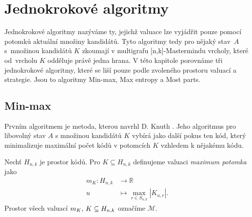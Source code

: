 
\chapter{Jednokrokové algoritmy}
Jednokrokové algoritmy nazýváme ty, jejichž valuace lze vyjádřit pouze pomocí potomků aktuální množiny kandidátů. Tyto algoritmy tedy pro nějaký stav~$A$ s~množinou kandidátů $K$ zkoumají v multigrafu [n,k]-Mastermindu vrcholy, které od~vrcholu $K$ odděluje právě jedna hrana. V této kapitole porovnáme tři jednokrokové algoritmy, které se liší pouze podle zvoleného prostoru valuací a strategie. Jsou to algoritmy Min-max, Max entropy a Most parts. 







\section{Min-max}
Prvním algoritmem je metoda, kterou navrhl D. Knuth \cite{donald_e__knuth_1977}. Jeho algoritmus pro libovolný stav $A$ s množinou kandidátů $K$ vybírá jako další pokus ten kód, který minimalizuje maximální počet kódů v potomcích $K$ vzhledem k nějakému kódu. 
\begin{definice}
    Nechť $H_{n,k}$ je prostor kódů. Pro $K \subseteq H_{n,k}$ definujeme valuaci \emph{maximum potomka} jako
    \begin{align*}
        m_K \colon H_{n,k} &\to \mathbb{R} \\
        u &\mapsto \max_{r\in S_{n,k}} |K_{u,r}|.
    \end{align*}
    Prostor všech valuací $m_K, \hspace{2px} K \subseteq H_{n,k}$ označíme $\mathcal{M}$. 
\end{definice}

